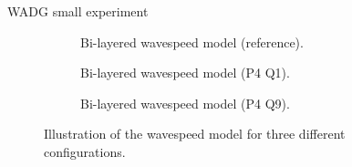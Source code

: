 \begin{frame}{WADG small experiment}

  \setlength{\modelwidth}{6.0cm}
\begin{figure}[htbp]
\begin{subfigure}{1.0\textwidth}
  \renewcommand{\modelfile}{image/num_exp_1/bicouche_model}
     \renewcommand{\cmapmin}{1500}
     \renewcommand{\cmapmax}{3000}
     \centering
     
     \caption{Bi-layered wavespeed model (reference).}
     \label{bicouche_model_with_mesh}
\end{subfigure}

\begin{subfigure}{0.45\textwidth}
  \renewcommand{\modelfile}{image/num_exp_1/bicouche_p4q1}
     \renewcommand{\cmapmin}{1500}
     \renewcommand{\cmapmax}{3000}
     \centering
     
     \caption{Bi-layered wavespeed model (P4 Q1).}
     \label{bicouche_model_without_mesh}
\end{subfigure}
\hspace{0.5cm}
\begin{subfigure}{0.45\textwidth}
  \renewcommand{\modelfile}{image/num_exp_1/bicouche_p4q9}
     \renewcommand{\cmapmin}{1500}
     \renewcommand{\cmapmax}{3000}
     \centering
     
     \caption{Bi-layered wavespeed model (P4 Q9).}
     \label{bicouche_model_with_wadg}
\end{subfigure}
\caption{Illustration of the wavespeed model for three different configurations.}
\label{bicouche_meshes}
\end{figure}
\end{frame}


